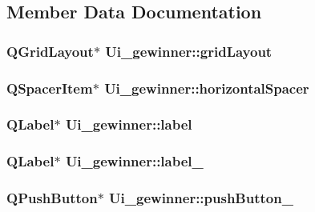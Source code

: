 \subsection{Member Data Documentation}
\hypertarget{classUi__gewinner_a5fa03a2e27a9588060a283a779a65a58}{
\subsubsection[{grid\-Layout}]{\setlength{\rightskip}{0pt plus 5cm}Q\-Grid\-Layout$\ast$ Ui\-\_\-gewinner\-::grid\-Layout}}\label{classUi__gewinner_a5fa03a2e27a9588060a283a779a65a58}
\hypertarget{classUi__gewinner_a41890d071db44fc57cb6b7f7be994d88}{
\subsubsection[{horizontal\-Spacer}]{\setlength{\rightskip}{0pt plus 5cm}Q\-Spacer\-Item$\ast$ Ui\-\_\-gewinner\-::horizontal\-Spacer}}\label{classUi__gewinner_a41890d071db44fc57cb6b7f7be994d88}
\hypertarget{classUi__gewinner_ab3ebd95d03d05884cc9c3c305f3231db}{
\subsubsection[{label}]{\setlength{\rightskip}{0pt plus 5cm}Q\-Label$\ast$ Ui\-\_\-gewinner\-::label}}\label{classUi__gewinner_ab3ebd95d03d05884cc9c3c305f3231db}
\hypertarget{classUi__gewinner_a4fbf4a6a07e338c3c533d78228089e5d}{
\subsubsection[{label\-\_\-2}]{\setlength{\rightskip}{0pt plus 5cm}Q\-Label$\ast$ Ui\-\_\-gewinner\-::label\-\_}}\label{classUi__gewinner_a4fbf4a6a07e338c3c533d78228089e5d}
\hypertarget{classUi__gewinner_ac3ddecfc2295e4ddbbfe5e1672943ab4}{
\subsubsection[{push\-Button\-\_\-2}]{\setlength{\rightskip}{0pt plus 5cm}Q\-Push\-Button$\ast$ Ui\-\_\-gewinner\-::push\-Button\-\_}}\label{classUi__gewinner_ac3ddecfc2295e4ddbbfe5e1672943ab4}
